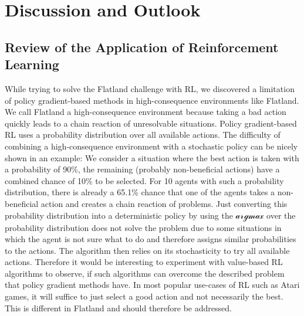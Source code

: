 %
%

\chapter{Discussion and Outlook}
\label{chap.diskussion}
\section{Review of the Application of Reinforcement Learning}\label{discussion_rl}
While trying to solve the Flatland challenge with RL, we discovered a limitation of policy gradient-based methods in high-consequence environments like Flatland.
We call Flatland a high-consequence environment because taking a bad action quickly leads to a chain reaction of unresolvable situations. Policy gradient-based RL uses a probability distribution over all available actions. The difficulty of combining a high-consequence environment with a stochastic policy can be nicely shown in an example: We consider a situation where the best action is taken with a probability of 90\%, the remaining (probably non-beneficial actions) have a combined chance of 10\% to be selected. For 10 agents with such a probability distribution, there is already a 65.1\% chance that one of the agents takes a non-beneficial action and creates a chain reaction of problems. Just converting this probability distribution into a deterministic policy by using the $\mathcal{argmax}$ over the probability distribution does not solve the problem due to some situations in which the agent is not sure what to do and therefore assigns similar probabilities to the actions. The algorithm then relies on its stochasticity to try all available actions. Therefore it would be interesting to experiment with value-based RL algorithms to observe, if such algorithms can overcome the described problem that policy gradient methods have. In most popular use-cases of RL such as Atari games, it will suffice to just select a good action and not necessarily the best. This is different in Flatland and should therefore be addressed.

